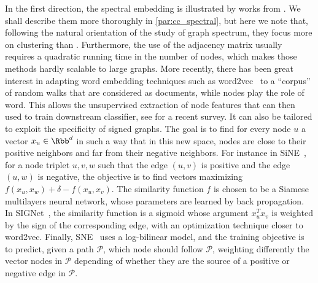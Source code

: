 \begin{newcontent}
In the first direction, the spectral embedding is illustrated by works from
\textcites{Kunegis2009}{SignedEmbedding15}. We shall describe them more thoroughly in
\autoref{par:cc_spectral}, but here we note that, following the natural orientation of the study of
graph spectrum, they focus more on clustering than \esp{}. Furthermore, the
use of the adjacency matrix usually requires a quadratic running time in the number of nodes, which
makes those methods hardly scalable to large graphs. More recently, there has been great interest in
adapting word embedding techniques such as \textsf{word2vec}~\autocite{word2vec13} to a
\enquote{corpus} of random walks that are considered as documents, while nodes play the role of
word. This allows the unsupervised extraction of node features that can then used to train
downstream classifier, see \autocite{nodeEmbeddingsurvey16} for a recent survey. It can also be
tailored to exploit the specificity of signed graphs.
The goal is to find for every node $u$ a vector $x_u\in\Rbb^d$ in such a way that in this new space,
nodes are close to their positive neighbors and far from their negative neighbors. For instance in
SiNE~\autocite{neuralSigned17}, for a node triplet $u,v,w$ such that the edge $(u,v)$ is positive
and the edge $(u,w)$ is negative, the objective is to find vectors maximizing $f(x_u, x_w) + \delta
- f(x_u, x_v)$. The similarity function $f$ is chosen to be a Siamese multilayers neural network,
whose parameters are learned by back propagation. In SIGNet~\autocite{SIGNet17}, the similarity
function is a sigmoid whose argument $x_u^Tx_v$ is weighted by the sign of the corresponding edge,
with an optimization technique closer to \textsf{word2vec}. Finally, SNE~\autocite{SNE17} uses a
log-bilinear model, and the training objective is to predict, given a path $\mathcal{P}$, which node
should follow $\mathcal{P}$, weighting differently the vector nodes in $\mathcal{P}$ depending of
whether they are the source of a positive or negative edge in $\mathcal{P}$.

\medskip


\end{newcontent}

